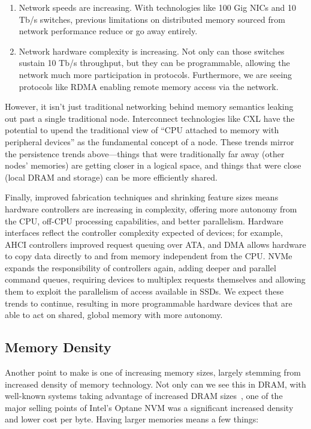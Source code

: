 \begin{enumerate}
    \item Network speeds are increasing. With technologies like 100 Gig NICs and 10 Tb/s switches, previous limitations on distributed memory sourced from network performance reduce or go away entirely.
    \item Network hardware complexity is increasing. Not only can those switches sustain 10 Tb/s throughput, but they can be programmable, allowing the network much more participation in
          protocols. Furthermore, we are seeing protocols like RDMA enabling remote memory access via the network.
\end{enumerate}

However, it isn't just traditional networking behind memory semantics leaking out past a single traditional node. Interconnect technologies like CXL have the potential to upend the
traditional view of ``CPU attached to memory with peripheral devices'' as the fundamental concept of a node. These trends mirror the persistence trends above---things that were traditionally far away (other nodes' memories) are getting closer in a logical space, and
things that were close (local DRAM and storage) can be more efficiently shared.

Finally, improved fabrication techniques and shrinking feature
sizes means hardware controllers are increasing in complexity, offering more autonomy from the CPU,
off-CPU processing capabilities, and better parallelism. Hardware interfaces reflect the controller
complexity expected of devices; for example, AHCI controllers improved request queuing over ATA, and DMA
allows hardware to copy data directly to and from memory independent from the CPU. NVMe
expands the responsibility of controllers again, adding deeper and parallel command queues, requiring
devices to multiplex requests themselves and allowing them to exploit the parallelism of access
available in SSDs. We expect these trends to continue, resulting in more programmable hardware
devices that are able to act on shared, global memory with more autonomy.

\subsection{Memory Density}

Another point to make is one of increasing memory sizes, largely stemming from increased density of memory technology.
Not only can we see this in DRAM, with well-known systems taking advantage of
increased DRAM sizes~\cite{ousterhout15}, one of the major selling points of Intel's Optane NVM was a significant
increased density and lower cost per byte. Having larger memories means a few things:


